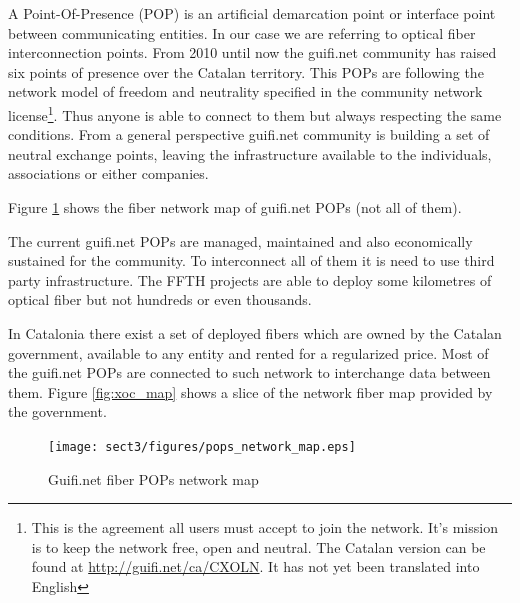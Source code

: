 A Point-Of-Presence (POP) is an artificial demarcation point or interface point between communicating entities.
In our case we are referring to optical fiber interconnection points.
From 2010 until now the guifi.net community has raised six points of presence over the Catalan territory.
This POPs are following the network model of freedom and neutrality specified in the community network license\footnote{This is the agreement all users must accept to join the network. It's mission is to keep the network free, open and neutral. The Catalan version can be found at \url{http://guifi.net/ca/CXOLN}. It has not yet been translated into English}.
Thus anyone is able to connect to them but always respecting the same conditions.
From a general perspective guifi.net community is building a set of neutral exchange points, leaving the
infrastructure available to the individuals, associations or either companies.

Figure \ref{fig:fibre_map} shows the fiber network map of guifi.net POPs (not all of them).

The current guifi.net POPs are managed, maintained and also economically sustained for the community. 
To interconnect all of them it is need to use third party infrastructure. The FFTH projects are able to deploy some kilometres
of optical fiber but not hundreds or even thousands.

In Catalonia there exist a set of deployed fibers which are owned by the Catalan government, available to any entity and 
rented for a regularized price. Most of the guifi.net POPs are connected to such network to interchange data
between them. Figure \ref{fig:xoc_map} shows a slice of the network fiber map provided by the government. 

\begin{figure}[htbp]
  \centering
  \texttt{[image: sect3/figures/pops\_network\_map.eps]} 
  \caption{Guifi.net fiber POPs network map}
  \label{fig:fibre_map}
\end{figure}

